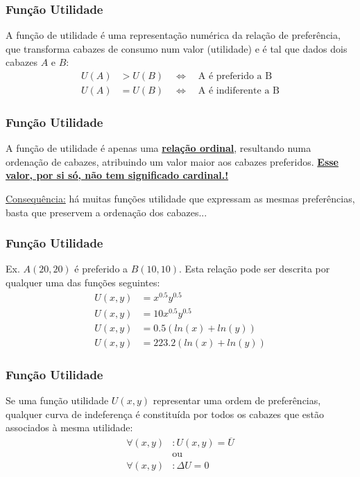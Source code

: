 \begin{frame}
	\frametitle{Fun\c c\~ao Utilidade}
	A fun\c c\~ao de utilidade \'e uma representa\c c\~ao num\'erica da rela\c c\~ao de prefer\^encia, que transforma cabazes de consumo num valor (utilidade) e \'e tal que dados dois cabazes $A$ e $B$:
	\begin{align*}
		U(A) &> U(B) \quad \Leftrightarrow \quad \text{A \'e preferido a B}\\
		U(A) &= U(B) \quad \Leftrightarrow \quad \text{A \'e indiferente a B}
	\end{align*}
\end{frame}


\begin{frame}
	\frametitle{Fun\c c\~ao Utilidade}
	A fun\c c\~ao de utilidade \'e apenas uma \textbf{\underline{rela\c c\~ao ordinal}}, resultando numa ordena\c c\~ao de cabazes, atribuindo um valor maior aos cabazes preferidos. \textbf{\underline{Esse valor, por si s\'o, n\~ao tem significado cardinal.!}}\pause

	\vspace{0.2cm}

	\underline{Consequ\^encia:} h\'a muitas fun\c c\~oes utilidade que expressam as mesmas prefer\^encias, basta que preservem a ordena\c c\~ao dos cabazes...
\end{frame}

\begin{frame}
	\frametitle{Fun\c c\~ao Utilidade}
	Ex. $A(20,20)$ \'e preferido a $B(10,10)$. Esta rela\c c\~ao pode ser descrita por qualquer uma das fun\c c\~oes seguintes:
	\begin{align*}
		U(x,y) &= x^{0.5}y^{0.5}\\
		U(x,y) &= 10x^{0.5}y^{0.5}\\
		U(x,y) &= 0.5(ln(x)+ln(y))\\
		U(x,y) &= 223.2(ln(x)+ln(y))
	\end{align*}
\end{frame}


\begin{frame}
	\frametitle{Fun\c c\~ao Utilidade}
	Se uma fun\c c\~ao utilidade $U(x,y)$ representar uma ordem de prefer\^encias, qualquer curva de indeferen\c ca \'e constitu\'ida por todos os cabazes que est\~ao associados \`a mesma utilidade:
	\begin{align*}
		\forall(x,y)&:U(x,y)=\overline{U}\\
		&\text{ou}\\
		\forall(x,y)&:\Delta U = 0
	\end{align*}
\end{frame}

